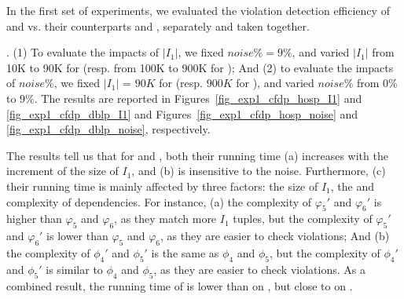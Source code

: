 In the first set of experiments, we evaluated the violation detection efficiency of  \pCFDs and \pCINDs vs. their counterparts \CFDs and \CINDs, separately and taken together.

.
(1) To evaluate the impacts of $|I_1|$, we fixed $noise\% = 9\%$, and varied $|I_1|$ from 10K to 90K for \hosp (resp. from 100K to 900K for \dblp); And (2) to evaluate the impacts of $noise\%$, we fixed $|I_1|$ = $90K$ for \hosp (resp. $900K$ for \dblp), and varied $noise\%$ from 0\% to 9\%.
%
The results are reported in Figures~\ref{fig_exp1_cfdp_hosp_I1} and \ref{fig_exp1_cfdp_dblp_I1} and Figures~\ref{fig_exp1_cfdp_hosp_noise} and \ref{fig_exp1_cfdp_dblp_noise}, respectively.


The results tell us that for \CFDs and \pCFDs, both their running time (a) increases with the increment of the size of $I_1$, and (b) is insensitive to the noise. Furthermore, (c) their running time is mainly affected by three factors: the size of $I_1$, the \LHS and \RHS complexity of dependencies.
For instance, (a) the \LHS complexity of \CFDs $\varphi_5'$ and $\varphi_6'$ is higher than \pCFDs $\varphi_5$ and $\varphi_6$, as they match more $I_1$ tuples, but the \RHS complexity of \CFDs $\varphi_5'$ and $\varphi_6'$ is lower than \pCFDs $\varphi_5$ and $\varphi_6$, as they are easier to check violations; And
(b) the \LHS complexity of \CFDs $\phi_4'$ and $\phi_5'$ is the same as  \pCFDs $\phi_4$ and $\phi_5$, but
 the \RHS complexity of \CFDs $\phi_4'$ and $\phi_5'$ is similar to \pCFDs $\phi_4$ and $\phi_5$, as they are easier to check violations.
As a combined result, the running time of \CFDs is lower than \pCFDs on \hosp, but close to \pCFDs on \dblp.


